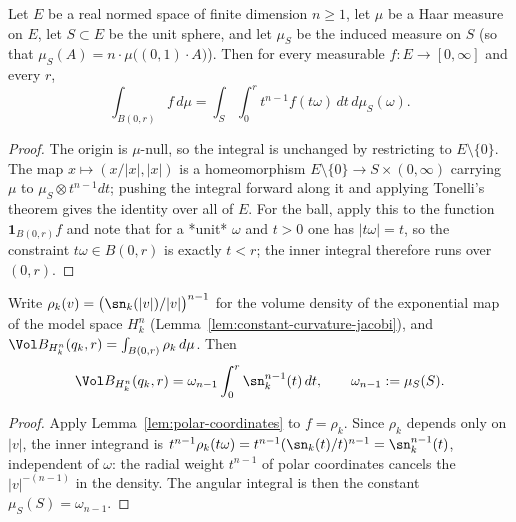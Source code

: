 \begin{lemma}
\label{lem:polar-coordinates}
\leanok
Let $E$ be a real normed space of finite dimension $n\ge1$, let $\mu$ be a Haar
measure on $E$, let $S\subset E$ be the unit sphere, and let $\mu_S$ be the
induced measure on $S$ (so that $\mu_S(A)=n\cdot\mu\bigl((0,1)\cdot A\bigr)$).
Then for every measurable $f\colon E\to[0,\infty]$ and every $r$,
$$\int_{B(0,r)}f\,d\mu
=\int_{S}\int_0^r t^{n-1}f(t\omega)\,dt\,d\mu_S(\omega).$$
\end{lemma}

\begin{proof}
\leanok
The origin is $\mu$-null, so the integral is unchanged by restricting to
$E\setminus\{0\}$. The map $x\mapsto(x/|x|,|x|)$ is a homeomorphism
$E\setminus\{0\}\to S\times(0,\infty)$ carrying $\mu$ to
$\mu_S\otimes t^{n-1}dt$; pushing the integral forward along it and applying
Tonelli's theorem gives the identity over all of $E$. For the ball, apply this
to the function $\mathbf 1_{B(0,r)}f$ and note that for a *unit* $\omega$ and
$t>0$ one has $|t\omega|=t$, so the constraint $t\omega\in B(0,r)$ is exactly
$t<r$; the inner integral therefore runs over $(0,r)$.
\end{proof}

\begin{lemma}
\label{lem:model-ball-volume}
\leanok
Write $\rho_k(v)=\bigl(\sn_k(|v|)/|v|\bigr)^{n-1}$ for the volume density of the
exponential map of the model space $H^n_k$ (Lemma~\ref{lem:constant-curvature-jacobi}),
and $\Vol B_{H^n_k}(q_k,r)=\int_{B(0,r)}\rho_k\,d\mu$. Then
$$\Vol B_{H^n_k}(q_k,r)=\omega_{n-1}\int_0^r\sn_k^{n-1}(t)\,dt,
\qquad \omega_{n-1}:=\mu_S(S).$$
\end{lemma}

\begin{proof}
\leanok
Apply Lemma~\ref{lem:polar-coordinates} to $f=\rho_k$. Since $\rho_k$ depends only
on $|v|$, the inner integrand is $t^{n-1}\rho_k(t\omega)=t^{n-1}(\sn_k(t)/t)^{n-1}
=\sn_k^{n-1}(t)$, independent of $\omega$: the radial weight $t^{n-1}$ of polar
coordinates cancels the $|v|^{-(n-1)}$ in the density. The angular integral is then
the constant $\mu_S(S)=\omega_{n-1}$.
\end{proof}

